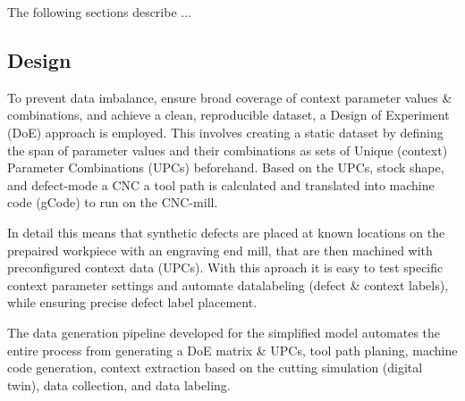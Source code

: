 \documentclass[5p,times,procedia]{elsarticle}
\begin{document}
The following sections describe ...


 








\subsection{Design}
\vspace*{-\baselineskip}
To prevent data imbalance, ensure broad coverage of context parameter values \& combinations, and achieve a clean, reproducible dataset, a Design of Experiment (DoE) approach is employed. This involves creating a static dataset by defining the span of parameter values and their combinations as sets of Unique (context) Parameter Combinations (UPCs) beforehand.
Based on the UPCs, stock shape, and defect-mode a CNC a tool path is calculated and translated into machine code (gCode) to run on the CNC-mill. 


In detail this means that synthetic defects are placed at known locations on the prepaired workpiece with an engraving end mill, that are then machined with preconfigured context data (UPCs). 
With this aproach it is easy to test specific context parameter settings and automate datalabeling (defect \& context labels), while ensuring precise defect label placement.


The data generation pipeline developed for the simplified model automates the entire process from generating a DoE matrix \& UPCs, tool path planing, machine code generation, context extraction based on the cutting simulation (digital twin), data collection, and data labeling.
\end{document}
